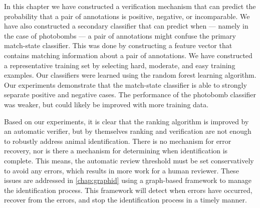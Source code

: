     In this chapter we have constructed a verification mechanism that can predict the probability that a pair of
    annotations is positive, negative, or incomparable. We have also constructed a secondary classifier that can
    predict when --- namely in the case of photobombs --- a pair of annotations might confuse the primary
    match-state classifier. This was done by constructing a feature vector that contains matching information about
    a pair of annotations. We have constructed a representative training set by selecting hard, moderate, and easy
    training examples. Our classifiers were learned using the random forest learning algorithm. Our experiments
    demonstrate that the match-state classifier is able to strongly separate positive and negative cases. The
    performance of the photobomb classifier was weaker, but could likely be improved with more training data.

    Based on our experiments, it is clear that the ranking algorithm is improved by an automatic verifier, but by
      themselves ranking and verification are not enough to robustly address animal identification.
    There is no mechanism for error recovery, nor is there a mechanism for determining when identification is
      complete.
    This means, the automatic review threshold must be set conservatively to avoid any errors, which results in
      more work for a human reviewer.
    These issues are addressed in \cref{chap:graphid} using a graph-based framework to manage the identification
      process.
    This framework will detect when errors have occurred, recover from the errors, and stop the identification
      process in a timely manner.
